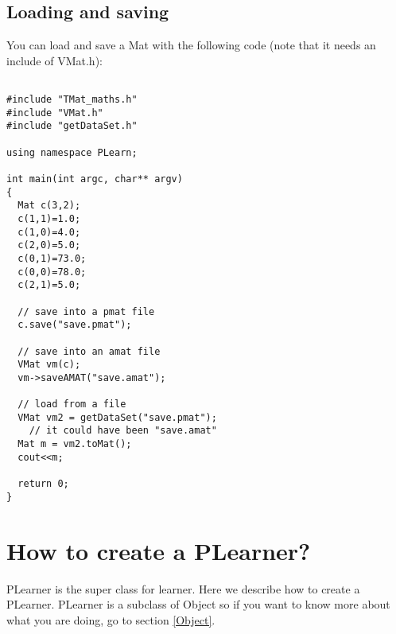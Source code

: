 \documentclass[11pt]{book}
\begin{document}
\subsection{Loading and saving}
You can load and save a Mat with the following code (note that it needs an 
include of VMat.h):
\begin{verbatim}

#include "TMat_maths.h"
#include "VMat.h"
#include "getDataSet.h"

using namespace PLearn;

int main(int argc, char** argv)
{
  Mat c(3,2);
  c(1,1)=1.0;
  c(1,0)=4.0;
  c(2,0)=5.0;
  c(0,1)=73.0;
  c(0,0)=78.0;
  c(2,1)=5.0;

  // save into a pmat file
  c.save("save.pmat");

  // save into an amat file
  VMat vm(c);
  vm->saveAMAT("save.amat");

  // load from a file
  VMat vm2 = getDataSet("save.pmat");
    // it could have been "save.amat"
  Mat m = vm2.toMat();
  cout<<m;

  return 0;
}

\end{verbatim}



\section{How to create a PLearner?}

PLearner is the super class for learner. Here we describe how to create a PLearner. PLearner is a subclass of Object so if you want to know more about what you are doing, go to section \ref{Object}.
\end{document}
